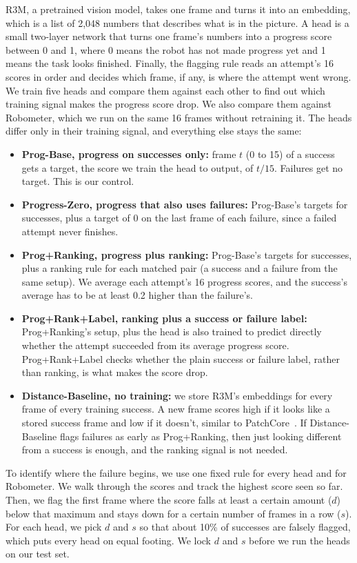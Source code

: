 \documentclass{article}
\begin{document}
R3M, a pretrained vision model, takes one frame and turns it into an embedding, which is a list of 2,048 numbers that describes what is in the picture. A head is a small two-layer network that turns one frame's numbers into a progress score between 0 and 1, where 0 means the robot has not made progress yet and 1 means the task looks finished. Finally, the flagging rule reads an attempt's 16 scores in order and decides which frame, if any, is where the attempt went wrong. We train five heads and compare them against each other to find out which training signal makes the progress score drop. We also compare them against Robometer, which we run on the same 16 frames without retraining it. The heads differ only in their training signal, and everything else stays the same:
\begin{itemize}
    \item \textbf{Prog-Base, progress on successes only:} frame $t$ (0 to 15) of a success gets a target, the score we train the head to output, of $t/15$. Failures get no target. This is our control.
    \item \textbf{Progress-Zero, progress that also uses failures:} Prog-Base's targets for successes, plus a target of 0 on the last frame of each failure, since a failed attempt never finishes.
    \item \textbf{Prog+Ranking, progress plus ranking:} Prog-Base's targets for successes, plus a ranking rule for each matched pair (a success and a failure from the same setup). We average each attempt's 16 progress scores, and the success's average has to be at least 0.2 higher than the failure's.
    \item \textbf{Prog+Rank+Label, ranking plus a success or failure label:} Prog+Ranking's setup, plus the head is also trained to predict directly whether the attempt succeeded from its average progress score. Prog+Rank+Label checks whether the plain success or failure label, rather than ranking, is what makes the score drop.
    \item \textbf{Distance-Baseline, no training:} we store R3M's embeddings for every frame of every training success. A new frame scores high if it looks like a stored success frame and low if it doesn't, similar to PatchCore~\citep{patchcore}. If Distance-Baseline flags failures as early as Prog+Ranking, then just looking different from a success is enough, and the ranking signal is not needed.
\end{itemize}

To identify where the failure begins, we use one fixed rule for every head and for Robometer. We walk through the scores and track the highest score seen so far. Then, we flag the first frame where the score falls at least a certain amount ($d$) below that maximum and stays down for a certain number of frames in a row ($s$). For each head, we pick $d$ and $s$ so that about 10\% of successes are falsely flagged, which puts every head on equal footing. We lock $d$ and $s$ before we run the heads on our test set.
\end{document}
